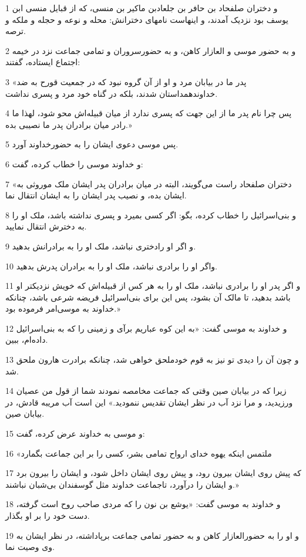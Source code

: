 \par 1 و دختران صلفحاد بن حافر بن جلعادبن ماکیر بن منسی، که از قبایل منسی ابن یوسف بود نزدیک آمدند، و اینهاست نامهای دخترانش: محله و نوعه و حجله و ملکه و ترصه.
\par 2 و به حضور موسی و العازار کاهن، و به حضورسروران و تمامی جماعت نزد در خیمه اجتماع ایستاده، گفتند:
\par 3 «پدر ما در بیابان مرد و او از آن گروه نبود که در جمعیت قورح به ضد خداوندهمداستان شدند، بلکه در گناه خود مرد و پسری نداشت.
\par 4 پس چرا نام پدر ما از این جهت که پسری ندارد از میان قبیله‌اش محو شود، لهذا ما رادر میان برادران پدر ما نصیبی بده.»
\par 5 پس موسی دعوی ایشان را به حضورخداوند آورد.
\par 6 و خداوند موسی را خطاب کرده، گفت:
\par 7 «دختران صلفحاد راست می‌گویند، البته در میان برادران پدر ایشان ملک موروثی به ایشان بده، و نصیب پدر ایشان را به ایشان انتقال نما.
\par 8 و بنی‌اسرائیل را خطاب کرده، بگو: اگر کسی بمیرد و پسری نداشته باشد، ملک او را به دخترش انتقال نمایید.
\par 9 و اگر او رادختری نباشد، ملک او را به برادرانش بدهید.
\par 10 واگر او را برادری نباشد، ملک او را به برادران پدرش بدهید.
\par 11 و اگر پدر او را برادری نباشد، ملک او را به هر کس از قبیله‌اش که خویش نزدیکتر او باشد بدهید، تا مالک آن بشود، پس این برای بنی‌اسرائیل فریضه شرعی باشد، چنانکه خداوند به موسی‌امر فرموده بود.»
\par 12 و خداوند به موسی گفت: «به این کوه عباریم برآی و زمینی را که به بنی‌اسرائیل داده‌ام، ببین.
\par 13 و چون آن را دیدی تو نیز به قوم خودملحق خواهی شد، چنانکه برادرت هارون ملحق شد.
\par 14 زیرا که در بیابان صین وقتی که جماعت مخامصه نمودند شما از قول من عصیان ورزیدید، و مرا نزد آب در نظر ایشان تقدیس ننمودید.» این است آب مریبه قادش، در بیابان صین.
\par 15 و موسی به خداوند عرض کرده، گفت:
\par 16 «ملتمس اینکه یهوه خدای ارواح تمامی بشر، کسی را بر این جماعت بگمارد
\par 17 که پیش روی ایشان بیرون رود، و پیش روی ایشان داخل شود، و ایشان را بیرون برد و ایشان را درآورد، تاجماعت خداوند مثل گوسفندان بی‌شبان نباشند.»
\par 18 و خداوند به موسی گفت: «یوشع بن نون را که مردی صاحب روح است گرفته، دست خود را بر او بگذار.
\par 19 و او را به حضورالعازار کاهن و به حضور تمامی جماعت برپاداشته، در نظر ایشان به وی وصیت نما.
